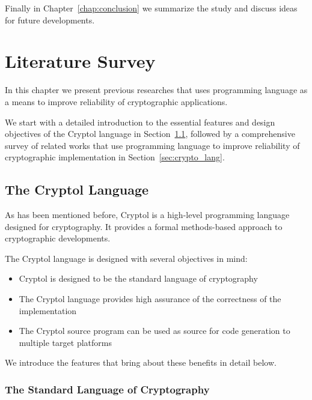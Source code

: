 \documentclass[a4paper, notitlepage]{report}
\renewcommand{\paragraph}[1]{\vspace*{1em}\noindent\textbf{#1}\hspace*{1em}}
\begin{document}
Finally in Chapter~\ref{chap:conclusion} we summarize the study and discuss
ideas for future developments.




\newpage
\chapter{Literature Survey}
\label{chap:survey}

In this chapter we present previous researches that uses programming
language as a means to improve reliability of cryptographic applications.

We start with a detailed introduction to the essential features and
design objectives of the Cryptol language in Section~\ref{sec:cryptol},
followed by a comprehensive survey of related works that use programming
language to improve reliability of cryptographic implementation in
Section~\ref{sec:crypto_lang}.

\section{The Cryptol Language}
\label{sec:cryptol}

As has been mentioned before, Cryptol is a high-level programming language
designed for cryptography. It provides a formal methods-based approach
to cryptographic developments.

The Cryptol language is designed with several objectives in mind:

\begin{itemize}
\item Cryptol is designed to be the standard language of cryptography
\item The Cryptol language provides high assurance of the correctness
of the implementation
\item The Cryptol source program can be used as source for code generation
to multiple target platforms
\end{itemize} 

We introduce the features that bring about these benefits in detail below.

\subsection{The Standard Language of Cryptography}
\end{document}

